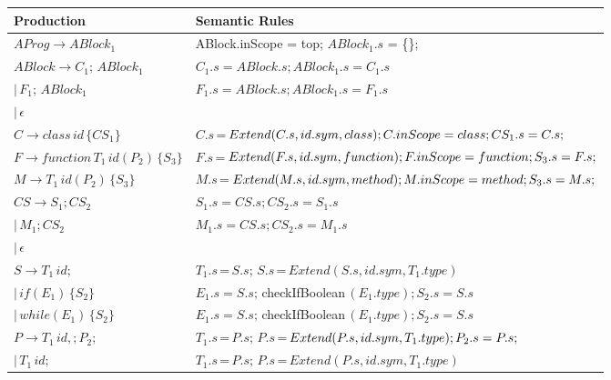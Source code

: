 \documentclass[11pt, oneside]{article}
\begin{document}
\begin{tabularx}{\textwidth}{ |X|X| }
\hline
\textbf{Production} & \textbf{Semantic Rules} \\
  
\hline $AProg \rightarrow ABlock_1$  &  ABlock.inScope = top; $ABlock_1.s$ = \{\}; \\

\hline $ABlock \rightarrow C_1; \, ABlock_1$  &  $C_1.s = ABlock.s; ABlock_1.s = C_1.s$ \\
	   $| \, F_1; \, ABlock_1$ & $F_1.s = ABlock.s; ABlock_1.s = F_1.s$ \\
	   $| \, \epsilon$ & \\
	   
\hline $C \rightarrow class \, id \, \{CS_1\} $ & $ C.s \, $=$ \, Extend(C.s, id.sym, class); \newline C.inScope = class; CS_1.s = C.s; $ \\

\hline $F \rightarrow function \, T_1 \, id(P_2) \, \{S_3\}$ & $F.s \, $=$ \, Extend(F.s, id.sym, function); \newline F.inScope = function; S_3.s = F.s; $ \\

\hline $M \rightarrow T_1 \, id(P_2) \, \{S_3\} $ & $ M.s \, $=$ \, Extend(M.s, id.sym, method); \newline M.inScope = method; S_3.s = M.s; $\\

\hline $CS \rightarrow S_1; CS_2 $ & $ S_1.s = CS.s; CS_2.s = S_1.s $\\
	   $| \, M_1; CS_2$ & $ M_1.s = CS.s; CS_2.s = M_1.s $ \\
	   $| \, \epsilon$ & \\

\hline $S \rightarrow T_1 \, id; $ & $T_1.s \, $=$ \, S.s; \, S.s \, $=$ \, Extend(S.s, id.sym, T_1.type)$ \\
	   $| \, if(E_1) \, \{S_2\} $ & $ E_1.s = S.s; \, $checkIfBoolean$ \, (E_1.type);  S_2.s = S.s $ \\
	   $| \, while(E_1) \, \{S_2\} $ & $ E_1.s = S.s; \, $checkIfBoolean$ \, (E_1.type);  S_2.s = S.s $ \\

\hline $P \rightarrow T_1 \, id,; P_2; $ & $T_1.s \, $=$ \, P.s; \, P.s \, $=$ \, Extend(P.s, id.sym, T_1.type); \newline P_2.s = P.s; $ \\
          $| \,  T_1 \, id; $ & $T_1.s \, $=$ \, P.s; \, P.s \, $=$ \, Extend(P.s, id.sym, T_1.type) $ \\
	   

\end{tabularx}
\end{document}
